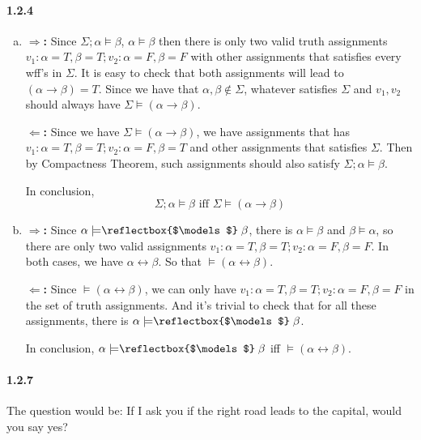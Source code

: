 \documentclass[11pt]{article}
\newcommand{\rmodels}{%
  \mathrel{\text{\reflectbox{$\models$}}}%
}
\begin{document}
	\paragraph{1.2.4}
	\begin{enumerate}[(a)]
		\item 
		\textbf{$\Rightarrow$:}
		Since $\Sigma; \alpha \models \beta$, $\alpha \models \beta$ then there is only two valid truth assignments $v_1: \alpha = T, \beta = T; v_2: \alpha = F, \beta = F$ with other assignments that satisfies every wff's in $\Sigma$. It is easy to check that both assignments will lead to $(\alpha \rightarrow \beta) = T$. Since we have that $\alpha, \beta \notin \Sigma$, whatever satisfies $\Sigma$ and $v_1, v_2$ should always have $\Sigma \models (\alpha \rightarrow \beta)$.
		
		\textbf{$\Leftarrow$:}
		Since we have $\Sigma \models (\alpha \rightarrow \beta)$, we have assignments that has $v_1: \alpha = T, \beta = T; v_2:  \alpha = F, \beta = T$ and other assignments that satisfies $\Sigma$. Then by Compactness Theorem, such assignments should also satisfy $\Sigma; \alpha \models \beta$.
		
		In conclusion, 
		\[\Sigma; \alpha \models \beta \text{ iff } \Sigma \models (\alpha \rightarrow \beta)\]
		
		\item
		\textbf{$\Rightarrow$:}
		Since $\alpha \models \rmodels \beta$, there is $\alpha \models \beta$ and $\beta \models \alpha$, so there are only two valid assignments $v_1: \alpha = T, \beta = T; v_2: \alpha = F, \beta = F$. In both cases, we have $\alpha \leftrightarrow \beta$. So that $\models (\alpha \leftrightarrow \beta)$.
		
		\textbf{$\Leftarrow$:}
		Since $\models (\alpha \leftrightarrow \beta)$, we can only have $v_1: \alpha = T, \beta = T; v_2: \alpha = F, \beta = F$ in the set of truth assignments. And it's trivial to check that for all these assignments, there is $\alpha \models \rmodels \beta$.
		
		In conclusion, $\alpha \models \rmodels \beta$ iff $\models (\alpha \leftrightarrow \beta)$.
		\end{enumerate}
		
		\paragraph{1.2.7}
		The question would be: If I ask you if the right road leads to the capital, would you say yes?
		
\end{document}
